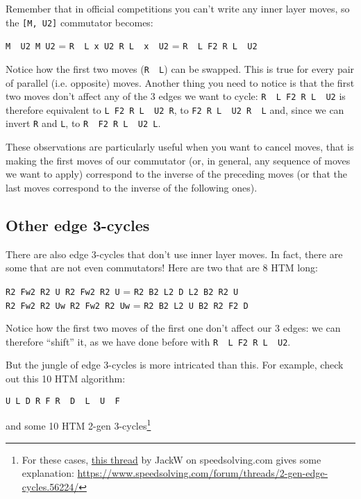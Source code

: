 \documentclass[11pt,a4paper]{book}
\newcommand{\p}{\textquotesingle}
\newcommand{\m}{\texttt}
\newcommand{\ps}{\p\,\,}
\begin{document}
Remember that in official competitions you can't write any inner layer moves, so the \m{[M\p, U2]} commutator becomes:

\begin{center}
\m{M\ps U2 M U2} = \m{R\ps L x U2 R L\ps x\ps U2} = \m{R\ps L F2 R L\ps U2}
\end{center}

Notice how the first two moves (\m{R\ps L}) can be swapped. This is true for every pair of parallel (i.e. opposite) moves.
Another thing you need to notice is that the first two moves don't affect any of the 3 edges we want to cycle: \m{R\ps L F2 R L\ps U2} is therefore equivalent to \m{L F2 R L\ps U2 R\p}, to \m{F2 R L\ps U2 R\ps L} and, since we can invert \m{R\p} and \m L, to \m{R\ps F2 R L\ps U2 L}.

These observations are particularly useful when you want to cancel moves, that is making the first moves of our commutator (or, in general, any sequence of moves we want to apply) correspond to the inverse of the preceding moves (or that the last moves correspond to the inverse of the following ones).

\subsection{Other edge 3-cycles}
\label{other-edge}

There are also edge 3-cycles that don't use inner layer moves. In fact, there are some that are not even commutators! Here are two that are 8 HTM long:

\begin{center}
\m{R2 Fw2 R2 U R2 Fw2 R2 U} = \m{R2 B2 L2 D L2 B2 R2 U}\\
\m{R2 Fw2 R2 Uw R2 Fw2 R2 Uw} = \m{R2 B2 L2 U B2 R2 F2 D}
\end{center}

Notice how the first two moves of the first one don't affect our 3 edges: we can therefore ``shift'' it, as we have done before with \m{R\ps L F2 R L\ps U2}.

But the jungle of edge 3-cycles is more intricated than this. For example, check out this 10 HTM algorithm:

\begin{center}
\m{U L D R F R\ps D\ps L\ps U\ps F\p}
\end{center}

and some 10 HTM 2-gen 3-cycles\footnote{For these cases, \href{https://www.speedsolving.com/forum/threads/2-gen-edge-cycles.56224/}{this thread} by JackW on speedsolving.com gives some explanation: \url{https://www.speedsolving.com/forum/threads/2-gen-edge-cycles.56224/}}
\end{document}
